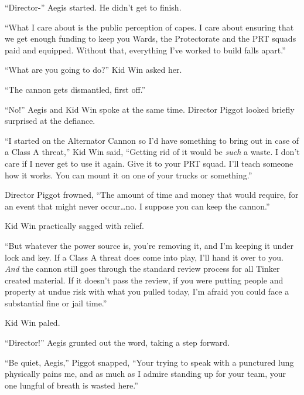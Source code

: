 ``Director-'' Aegis started.  He didn't get to finish.



``What I care about is the public perception of capes.  I care about ensuring that we get enough funding to keep you Wards, the Protectorate and the PRT squads paid and equipped.  Without that, everything I've worked to build falls apart.''



``What are you going to do?'' Kid Win asked her.



``The cannon gets dismantled, first off.''



``No!'' Aegis and Kid Win spoke at the same time.  Director Piggot looked briefly surprised at the defiance.



``I started on the Alternator Cannon so I'd have something to bring out in case of a Class A threat,'' Kid Win said, ``Getting rid of it would be \emph{such} a waste.  I don't care if I never get to use it again.  Give it to your PRT squad.  I'll teach someone how it works.  You can mount it on one of your trucks or something.''



Director Piggot frowned, ``The amount of time and money that would require, for an event that might never occur\ldots no.  I suppose you can keep the cannon.''



Kid Win practically sagged with relief.



``But whatever the power source is, you're removing it, and I'm keeping it under lock and key.  If a Class A threat does come into play, I'll hand it over to you.  \emph{And} the cannon still goes through the standard review process for all Tinker created material.  If it doesn't pass the review, if you were putting people and property at undue risk with what you pulled today, I'm afraid you could face a substantial fine or jail time.''



Kid Win paled.



``Director!'' Aegis grunted out the word, taking a step forward.



``Be quiet, Aegis,'' Piggot snapped, ``Your trying to speak with a punctured lung physically pains me, and as much as I admire standing up for your team, your one lungful of breath is wasted here.''



